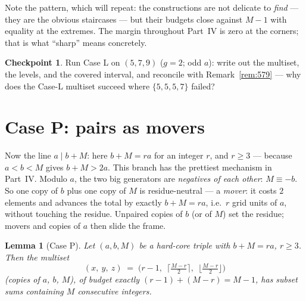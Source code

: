 \documentclass[11pt,reqno]{amsart}
\theoremstyle{plain}
\newtheorem{lemma}[theorem]{Lemma}
\theoremstyle{definition}
\newtheorem{checkpoint}[theorem]{Checkpoint}   %
\theoremstyle{remark}
\begin{document}
Note the pattern, which will repeat: the constructions are not delicate to
\emph{find} --- they are the obvious staircases --- but their budgets close
against $M - 1$ with equality at the extremes. The margin throughout Part~IV is
zero at the corners; that is what ``sharp'' means concretely.

\begin{checkpoint}
Run Case L on $(5, 7, 9)$ ($g = 2$; odd $a$): write out the multiset, the levels,
and the covered interval, and reconcile with Remark~\ref{rem:579} --- why does
the Case-L multiset succeed where $\{5,5,5,7\}$ failed?
\end{checkpoint}


\section{Case P: pairs as movers}\label{sec:caseP-friendly}

Now the line $a \mid b + M$: here $b + M = ra$ for an integer $r$, and $r \ge 3$
--- because $a < b < M$ gives $b + M > 2a$. This branch has the prettiest
mechanism in Part~IV. Modulo $a$, the two big generators
are \emph{negatives of each other}: $M \equiv -b$. So one copy of $b$ plus one
copy of $M$ is residue-neutral --- a \emph{mover}: it costs $2$ elements and
advances the total by exactly $b + M = ra$, i.e.\ $r$ grid units of $a$, without
touching the residue. Unpaired copies of $b$ (or of $M$) set the residue; movers
and copies of $a$ then slide the frame.

\begin{lemma}[Case P]\label{lem:caseP-friendly}
Let $(a, b, M)$ be a hard-core triple with $b + M = ra$, $r \ge 3$. Then the
multiset
\[
  (x,\ y,\ z) \;=\; \Big( r - 1,\ \ \Big\lceil \tfrac{M - r}{2} \Big\rceil,\ \
  \Big\lfloor \tfrac{M - r}{2} \Big\rfloor \Big)
\]
(copies of $a$, $b$, $M$), of budget exactly $(r-1) + (M - r) = M - 1$, has subset
sums containing $M$ consecutive integers.
\end{lemma}
\end{document}
